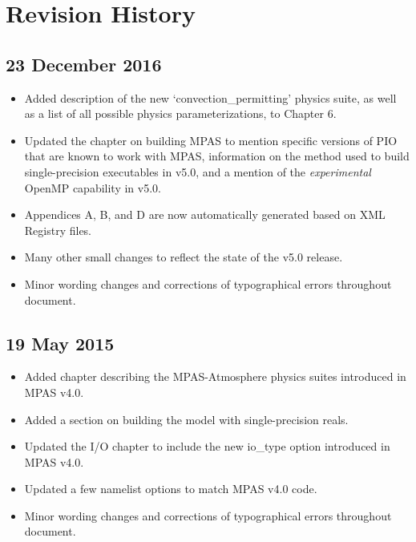 
\chapter{Revision History}

\section*{23 December 2016}

\begin{itemize}
\item Added description of the new `convection\_permitting' physics suite, as well as
a list of all possible physics parameterizations, to Chapter 6.
\item Updated the chapter on building MPAS to mention specific versions of PIO that are known
to work with MPAS, information on the method used to build single-precision executables in v5.0,
and a mention of the {\em experimental} OpenMP capability in v5.0.
\item Appendices A, B, and D are now automatically generated based on XML Registry files.
\item Many other small changes to reflect the state of the v5.0 release.
\item Minor wording changes and corrections of typographical errors throughout document.
\end{itemize}

\section*{19 May 2015}

\begin{itemize}
\item Added chapter describing the MPAS-Atmosphere physics suites introduced in MPAS v4.0.
\item Added a section on building the model with single-precision reals.
\item Updated the I/O chapter to include the new io\_type option introduced in MPAS v4.0.
\item Updated a few namelist options to match MPAS v4.0 code.
\item Minor wording changes and corrections of typographical errors throughout document.
\end{itemize}

